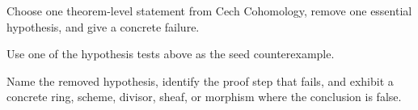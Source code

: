 \begin{exercise}\label{exr:vi47-expand-16}
Choose one theorem-level statement from Cech Cohomology, remove one essential hypothesis, and give a concrete failure.
\end{exercise}
\begin{hint}
Use one of the hypothesis tests above as the seed counterexample.
\end{hint}
\begin{solution}
Name the removed hypothesis, identify the proof step that fails, and exhibit a concrete ring, scheme, divisor, sheaf, or morphism where the conclusion is false.
\end{solution}

